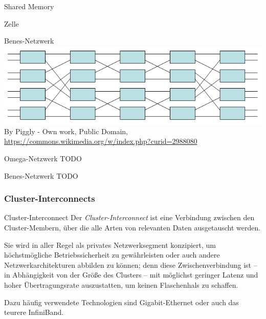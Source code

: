 \begin{defi}{Shared Memory}
\begin{defi}{Zelle}
    \end{defi}

    \begin{defi}{Benes-Netzwerk}
        \includegraphics[width=\textwidth]{images/Benesnetwork.png}
        By Piggly - Own work, Public Domain, \url{https://commons.wikimedia.org/w/index.php?curid=2988080}
    \end{defi}

    \begin{defi}{Omega-Netzwerk}
        TODO
    \end{defi}

    \begin{defi}{Benes-Netzwerk}
        TODO
    \end{defi}

    \subsubsection{Cluster-Interconnects}

    \begin{defi}{Cluster-Interconnect}
        Der \emph{Cluster-Interconnect} ist eine Verbindung zwischen den Cluster-Membern, über die alle Arten von relevanten Daten ausgetauscht werden.

        Sie wird in aller Regel als privates Netzwerksegment konzipiert, um höchstmögliche Betriebssicherheit zu gewährleisten oder auch andere Netzwerkarchitekturen abbilden zu können;
        denn diese Zwischenverbindung ist -- in Abhängigkeit von der Größe des Clusters -- mit möglichst geringer Latenz und hoher Übertragungsrate auszustatten, um keinen Flaschenhals zu schaffen.

        Dazu häufig verwendete Technologien sind Gigabit-Ethernet oder auch das teurere InfiniBand.
    \end{defi}


\end{defi}
